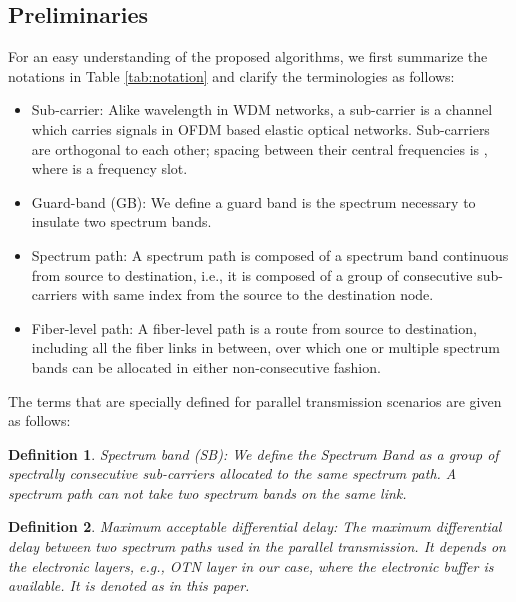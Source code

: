 \documentclass[conference]{IEEEtran}
\newtheorem{definition}{Definition}
\begin{document}
\subsection{Preliminaries}
For an easy understanding of the proposed algorithms, we first summarize the notations in Table \ref{tab:notation} and clarify the terminologies as follows:
\begin{itemize}
\item Sub-carrier:  Alike wavelength in WDM networks, a sub-carrier is a channel  which carries signals in OFDM based elastic optical networks. Sub-carriers are orthogonal to each other; spacing between their central frequencies is , where  is a frequency slot.
\cite{Shieh:book}
\item Guard-band (GB): We define a guard band is the spectrum necessary to insulate two spectrum bands.
\item Spectrum path:  A spectrum path is composed of a spectrum band continuous from source to destination, i.e., it is composed of a group of consecutive sub-carriers with same index from the source to the destination node.
\item Fiber-level path: A fiber-level path is a route from source to destination, including all the fiber links in between, over which one or multiple spectrum bands can be allocated in either non-consecutive fashion. 
\end{itemize}
The terms that are specially defined for parallel transmission scenarios are given as follows:
\begin{definition}
\emph{Spectrum band (SB):} We define the \emph{Spectrum Band}  as a group of  spectrally consecutive sub-carriers allocated to the same spectrum path. 
A spectrum path can not take two spectrum bands on the same link.
\end{definition}
\begin{definition}
\emph{Maximum acceptable differential delay:} The maximum differential delay between two spectrum paths used in the parallel transmission. It depends on the  electronic layers, e.g., OTN layer in our case, where the electronic buffer is available. It is denoted as  in this paper. 
 \end{definition}
  
\end{document}
